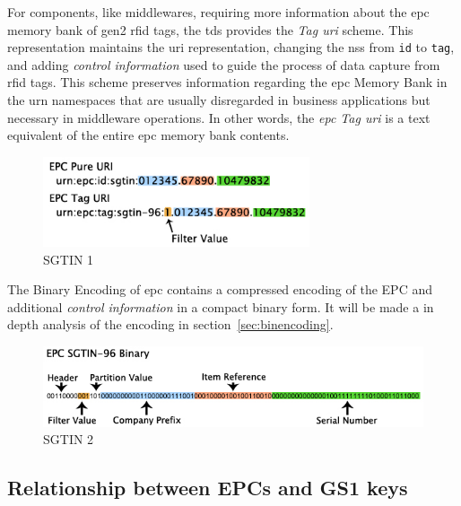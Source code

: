 For components, like middlewares, requiring more information about the \ac{epc} memory bank of \ac{gen2} \ac{rfid} tags, the \ac{tds} provides the \emph{Tag \ac{uri}} scheme.
This representation maintains the \ac{uri} representation, changing the \ac{nss} from \texttt{id} to \texttt{tag}, and adding \textit{control information} used to guide the process of data capture from \ac{rfid} tags.
This scheme preserves information regarding the \ac{epc} Memory Bank in the \ac{urn} namespaces that are usually disregarded in business applications but necessary in middleware operations.
In other words, the \emph{\ac{epc} Tag \ac{uri}} is a text equivalent of the entire \ac{epc} memory bank contents.

\begin{figure}[!ht]
    \centering
    \includegraphics[width=0.7\textwidth]{./figs/02-state-of-the-art/SGTIN_First2encodings.jpg}
    \caption{SGTIN 1~\cite{SGTININFO}} 
    \label{fig:1111}
\end{figure}

The Binary Encoding of \ac{epc} contains a compressed encoding of the EPC and additional \textit{control information} in a compact binary form.
It will be made a in depth analysis of the encoding in section~\ref{sec:binencoding}.

\begin{figure}[!ht]
    \centering
    \includegraphics[width=\textwidth]{./figs/02-state-of-the-art/SGTIN_binaryconv2.jpg}
    \caption{SGTIN 2~\cite{SGTININFO}} 
    \label{fig:2222}
\end{figure}

\subsection{Relationship between EPCs and GS1 keys}


